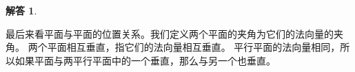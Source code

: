 \documentclass[12pt,UTF8]{ctexbook}
\newtheorem*{so}{解答}
\begin{document}
\begin{so}
    
\end{so}

最后来看平面与平面的位置关系。我们定义两个平面的夹角为它们的法向量的夹角。
两个平面相互垂直，指它们的法向量相互垂直。
平行平面的法向量相同，所以如果平面与两平行平面中的一个垂直，那么与另一个也垂直。
\end{document}
